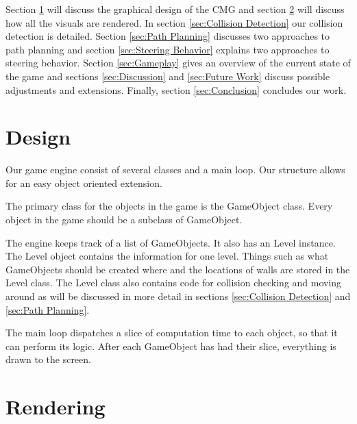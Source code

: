 \documentclass[a4paper,pdf,12pt]{article}
\begin{document}
Section \ref{sec:Design} will discuss the graphical design of the CMG and section \ref{sec:Rendering} will discuss how all the visuals are rendered. In section \ref{sec:Collision Detection} our collision detection is detailed. Section \ref{sec:Path Planning} discusses two approaches to path planning and section \ref{sec:Steering Behavior} explains two approaches to steering behavior. Section \ref{sec:Gameplay} gives an overview of the current state of the game and sections \ref{sec:Discussion} and \ref{sec:Future Work} discuss possible adjustments and extensions. Finally, section \ref{sec:Conclusion} concludes our work.

\section{Design}
\label{sec:Design}

Our game engine consist of several classes and a main loop. Our structure allows for an easy object oriented extension. 

The primary class for the objects in the game is the GameObject class. Every object in the game should be a subclass of GameObject. 

The engine keeps track of a list of GameObjects. It also has an Level instance. The Level object contains the information for one level. Things such as what GameObjects should be created where and the locations of walls are stored in the Level class. The Level class also contains code for collision checking and moving around as will be discussed in more detail in sections \ref{sec:Collision Detection} and \ref{sec:Path Planning}.

The main loop dispatches a slice of computation time to each object, so that it can perform its logic. After each GameObject has had their slice, everything is drawn to the screen.

\section{Rendering}
\label{sec:Rendering}
\end{document}

